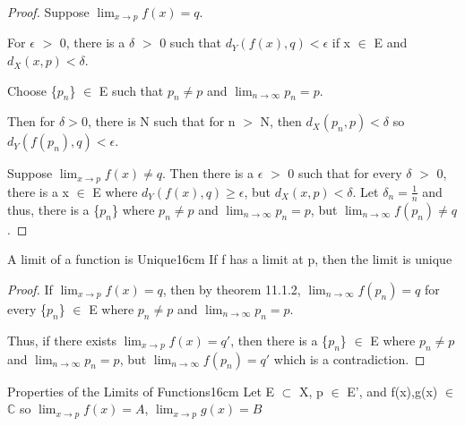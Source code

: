    \begin{proof}
        Suppose $\lim_{x \rightarrow p} f(x) = q$.

        For $\epsilon$ $>$ 0, there is a $\delta$ $>$ 0 such that
        $d_Y(f(x),q) < \epsilon$ if x $\in$ E and $d_X(x,p) < \delta$.

        Choose \{$p_n$\} $\in$ E such that $p_n \not = p$
        and $\lim_{n \rightarrow \infty} p_n = p$.

        Then for $\delta > 0$, there is N such that for n $>$ N, then
        $d_X(p_n,p)< \delta$ so $d_Y(f(p_n),q) < \epsilon$.

        \vspace{0.2cm}

        Suppose $\lim_{x \rightarrow p} f(x) \not = q$.
        Then there is a $\epsilon$ $>$ 0 such that for every $\delta$ $>$ 0,
        there is a x $\in$ E where $d_Y(f(x),q) \geq \epsilon$, but
        $d_X(x,p) < \delta$.
        Let $\delta_n = \frac{1}{n}$ and thus, there is a \{$p_n$\}
        where $p_n \not = p$ and $\lim_{n \rightarrow \infty} p_n = p$,
        but $\lim_{n \rightarrow \infty} f(p_n) \not = q$.
    \end{proof}

    \vspace{0.5cm}



    \begin{corollary}{A limit of a function is Unique}{16cm}
        If f has a limit at p, then the limit is unique
    \end{corollary}

    \begin{proof}
        If $\lim_{x \rightarrow p} f(x) = q$, then by {\color{red} theorem 11.1.2},
        $\lim_{n \rightarrow \infty} f(p_n) = q$ for every
        \{$p_n$\} $\in$ E where $p_n \not = p$ and
        $\lim_{n \rightarrow \infty} p_n = p$.

        Thus, if there exists $\lim_{x \rightarrow p} f(x) = q'$, then there is
        a \{$p_n$\} $\in$ E where $p_n \not = p$ and
        $\lim_{n \rightarrow \infty} p_n = p$, but
        $\lim_{n \rightarrow \infty} f(p_n) = q'$ which is a contradiction.
    \end{proof}

    \vspace{0.5cm}



    \begin{wtheorem}{Properties of the Limits of Functions}{16cm}
        Let E $\subset$ X, p $\in$ E', and f(x),g(x) $\in$ $\mathbb{C}$ so 
        $\lim_{x \rightarrow p} f(x) = A$, $\lim_{x \rightarrow p} g(x) = B$
    \end{wtheorem}

